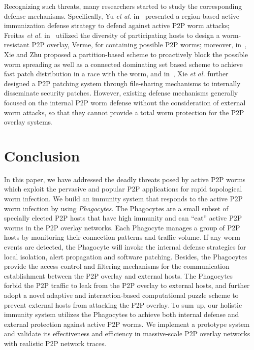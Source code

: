 \documentclass[times,10pt,twocolumn]{article}
\begin{document}
Recognizing such threats, many researchers started to study the
corresponding defense mechanisms. Specifically, Yu \emph{et al.}
in~\cite{1577951} presented a region-based active immunization
defense strategy to defend against active P2P worm attacks; Freitas
\emph{et al.} in~\cite{FreitasRRFR07} utilized the diversity of
participating hosts to design a worm-resistant P2P overlay, Verme,
for containing possible P2P worms; moreover, in~\cite{1307179}, Xie
and Zhu proposed a partition-based scheme to proactively block the
possible worm spreading as well as a connected dominating set based
scheme to achieve fast patch distribution in a race with the worm,
and in~\cite{XieSZ08}, Xie \emph{et al.} further designed a P2P
patching system through file-sharing mechanisms to internally
disseminate security patches. However, existing defense mechanisms
generally focused on the internal P2P worm defense without the
consideration of external worm attacks, so that they cannot provide
a total worm protection for the P2P overlay systems.









\section{Conclusion}
\label{Conclusions}

In this paper, we have addressed the deadly threats posed by active
P2P worms which exploit the pervasive and popular P2P applications
for rapid topological worm infection. We build an immunity system
that responds to the active P2P worm infection by using
\emph{Phagocytes}. The Phagocytes are a small subset of specially
elected P2P hosts that have high immunity and can ``eat'' active P2P
worms in the P2P overlay networks. Each Phagocyte manages a group of
P2P hosts by monitoring their connection patterns and traffic
volume. If any worm events are detected, the Phagocyte will invoke
the internal defense strategies for local isolation, alert
propagation and software patching. Besides, the Phagocytes provide
the access control and filtering mechanisms for the communication
establishment between the P2P overlay and external hosts. The
Phagocytes forbid the P2P traffic to leak from the P2P overlay to
external hosts, and further adopt a novel adaptive and
interaction-based computational puzzle scheme to prevent external
hosts from attacking the P2P overlay. To sum up, our holistic
immunity system utilizes the Phagocytes to achieve both internal
defense and external protection against active P2P worms. We
implement a prototype system and validate its effectiveness and
efficiency in massive-scale P2P overlay networks with realistic P2P
network traces.











\footnotesize{

}
\end{document}
